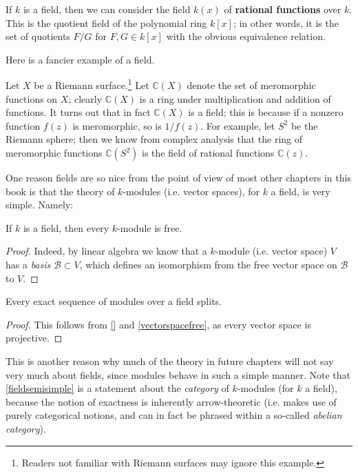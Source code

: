 \begin{example} \label{monofldext}
\label{rationalfnfld}
If $k$ is a field, then we can consider the field $k(x)$ of \textbf{rational functions}
over $k$. This is the quotient field of the polynomial ring $k[x]$; in other
words, it is the set of quotients $F/G$ for $F, G \in k[x]$ with the obvious
equivalence relation.
\end{example} 


Here is a fancier example of a field.
\begin{example} 
\label{meromorphicfn}
Let $X$ be a Riemann surface.\footnote{Readers not familiar with Riemann
surfaces may ignore this example.} Let $\mathbb{C}(X)$ denote the
set of meromorphic functions on $X$; clearly $\mathbb{C}(X)$ is a ring under
multiplication and addition of functions. It turns out that in fact
$\mathbb{C}(X)$ is a
field; this is because if a nonzero function $f(z)$ is meromorphic, so is $1/f(z)$. For example,
let $S^2$ be the Riemann sphere; then we know from complex
analysis that the ring of meromorphic functions $\mathbb{C}(S^2)$ is the
field of rational functions $\mathbb{C}(z)$. 
\end{example}



One reason fields are so nice from the point of view of most other chapters
in this book is that the theory of $k$-modules (i.e. vector spaces), for $k$ a field, is very simple.
Namely:

\begin{proposition}  \label{vectorspacefree}
If $k$ is a field, then every $k$-module is free.
\end{proposition} 
\begin{proof} 
Indeed, by linear algebra we know that a $k$-module (i.e. vector space) $V$ has a
\emph{basis} $\mathcal{B} \subset V$, which defines an isomorphism from the
free vector space on $\mathcal{B}$ to $V$.
\end{proof} 

\begin{corollary} \label{fieldsemisimple}
Every exact sequence of modules over a field splits.
\end{corollary} 
\begin{proof} 
This follows from \cref{} and \cref{vectorspacefree}, as every vector space is
projective.
\end{proof} 

This is another reason why much of the theory in future chapters will not say
very much about fields, since modules behave in such a simple manner.
Note that \cref{fieldsemisimple} is a statement about the \emph{category} of
$k$-modules (for $k$ a field), because the notion of exactness is inherently
arrow-theoretic (i.e. makes use of purely categorical notions, and can in fact
be phrased within a so-called \emph{abelian category}).

